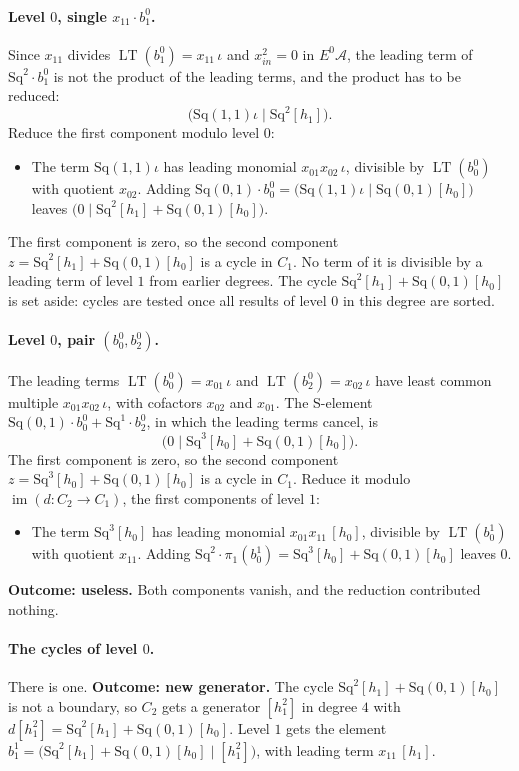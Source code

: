 \documentclass[11pt]{article}
\newcommand{\Sq}{\mathrm{Sq}}
\newcommand{\A}{\mathcal{A}}
\DeclareMathOperator{\LT}{LT}
\begin{document}
\paragraph{Level $0$, single $x_{11}\cdot b^{0}_{1}$.} Since $x_{11}$ divides $\LT(b^{0}_{1}) = x_{11}\,\iota$ and $x_{in}^2 = 0$ in $E^0\A$, the leading term of $\Sq^{2}\cdot b^{0}_{1}$ is not the product of the leading terms, and the product has to be reduced:
\[\bigl(\Sq(1,1)\iota \;\big|\; \Sq^{2}[h_1]\bigr).\]
Reduce the first component modulo level $0$:
\begin{itemize}
\item The term $\Sq(1,1)\iota$ has leading monomial $x_{01}x_{02}\,\iota$, divisible by $\LT(b^{0}_{0})$ with quotient $x_{02}$. Adding $\Sq(0,1)\cdot b^{0}_{0} = \bigl(\Sq(1,1)\iota \;\big|\; \Sq(0,1)[h_0]\bigr)$ leaves $\bigl(0 \;\big|\; \Sq^{2}[h_1] + \Sq(0,1)[h_0]\bigr)$.
\end{itemize}
The first component is zero, so the second component $z = \Sq^{2}[h_1] + \Sq(0,1)[h_0]$ is a cycle in $C_{1}$.
No term of it is divisible by a leading term of level $1$ from earlier degrees.
The cycle $\Sq^{2}[h_1] + \Sq(0,1)[h_0]$ is set aside: cycles are tested once all results of level $0$ in this degree are sorted.
\medskip
\paragraph{Level $0$, pair $(b^{0}_{0}, b^{0}_{2})$.} The leading terms $\LT(b^{0}_{0}) = x_{01}\,\iota$ and $\LT(b^{0}_{2}) = x_{02}\,\iota$ have least common multiple $x_{01}x_{02}\,\iota$, with cofactors $x_{02}$ and $x_{01}$. The S-element $\Sq(0,1)\cdot b^{0}_{0} + \Sq^{1}\cdot b^{0}_{2}$, in which the leading terms cancel, is
\[\bigl(0 \;\big|\; \Sq^{3}[h_0] + \Sq(0,1)[h_0]\bigr).\]
The first component is zero, so the second component $z = \Sq^{3}[h_0] + \Sq(0,1)[h_0]$ is a cycle in $C_{1}$.
Reduce it modulo $\operatorname{im}(d\colon C_{2}\to C_{1})$, the first components of level $1$:
\begin{itemize}
\item The term $\Sq^{3}[h_0]$ has leading monomial $x_{01}x_{11}\,[h_0]$, divisible by $\LT(b^{1}_{0})$ with quotient $x_{11}$. Adding $\Sq^{2}\cdot \pi_1(b^{1}_{0}) = \Sq^{3}[h_0] + \Sq(0,1)[h_0]$ leaves $0$.
\end{itemize}
\textbf{Outcome: useless.} Both components vanish, and the reduction contributed nothing.
\medskip
\paragraph{The cycles of level $0$.} There is one.
\textbf{Outcome: new generator.} The cycle $\Sq^{2}[h_1] + \Sq(0,1)[h_0]$ is not a boundary, so $C_{2}$ gets a generator $[h_1^2]$ in degree $4$ with $d[h_1^2] = \Sq^{2}[h_1] + \Sq(0,1)[h_0]$.
Level $1$ gets the element $b^{1}_{1} = \bigl(\Sq^{2}[h_1] + \Sq(0,1)[h_0] \;\big|\; [h_1^2]\bigr)$, with leading term $x_{11}\,[h_1]$.
\medskip
\end{document}
